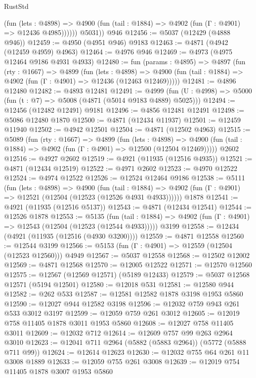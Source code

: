 \begin{lexlean}{RustStd}
\begin{coremodule}
              (fun (lets : @4898) =>
              @4900 (fun (tail : @1884) => @4902 (fun (Γ : @4901) => @12436 @4985))))))
        @5031))
    @946
@12456 := @5037 (@12429 (@4888 @946))
@12459 := @4950 (@4951 @946) @9183
@12463 := @4871 (@4942 (@12459 @4959) @4963)
@12464 := @4976 @946
@12469 := @4973 (@4975 @12464 @9186 @4931 @4933)
@12480 := fun (params : @4895) =>
  @4897
    (fun (rty : @1667) =>
    @4899
      (fun (lets : @4898) =>
      @4900 (fun (tail : @1884) => @4902 (fun (Γ : @4901) => @12436 (@12463 @12469)))))
@12481 := @4896 @12480
@12482 := @4893 @12481
@12491 := @4999 (fun (U : @4998) => @5000 (fun (t : @7) => @5008 (@4871 (@5014 @9183 @4889) @5025)))
@12494 := @12456 (@12482 @12491) @9181
@12496 := @4856 @12481 @12491
@12498 := @5086 @12480 @1870
@12500 := @4871 (@12434 @11937)
@12501 := @12459 @11940
@12502 := @4942 @12501
@12504 := @4871 (@12502 @4963)
@12515 := @5089
    (fun (rty : @1667) =>
    @4899
      (fun (lets : @4898) =>
      @4900 (fun (tail : @1884) => @4902 (fun (Γ : @4901) => @12500 (@12504 @12469)))))
    @2602
@12516 := @4927 @2602
@12519 := @4921 (@11935 (@12516 @4935))
@12521 := @4871 (@12434 @12519)
@12522 := @4971 @2602
@12523 := @4970 @12522
@12524 := @4974 @12522
@12526 := @12524 @12464 @9186
@12538 := @5111
    (fun (lets : @4898) =>
    @4900
      (fun (tail : @1884) =>
      @4902 (fun (Γ : @4901) => @12521 (@12504 (@12523 (@12526 @4931 @4933))))))
    @1878
@12541 := @4921 (@11935 (@12516 @5137))
@12543 := @4871 (@12434 @12541)
@12544 := @12526 @1878
@12553 := @5135
    (fun (tail : @1884) => @4902 (fun (Γ : @4901) => @12543 (@12504 (@12523 (@12544 @4933)))))
    @3199
@12558 := @12434 (@4921 (@11935 (@12516 (@4930 @3200))))
@12559 := @4871 @12558
@12560 := @12544 @3199
@12566 := @5153 (fun (Γ : @4901) => @12559 (@12504 (@12523 @12560))) @4949
@12567 := @5037 @12558
@12568 := @12502 @12002
@12569 := @4871 @12568
@12570 := @12005 @12522
@12571 := @12570 @12560
@12575 := @12567 (@12569 @12571) (@5189 @12433)
@12579 := @5037 @12568 @12571 (@5194 @12501)
@12580 := @12018 @531
@12581 := @12580 @944
@12582 := @262 @533
@12587 := @12581 @12582 @1878 @3198 @1953 @5860
@12590 := @12027 @944 @12582 @3198
@12596 := @12032 @759 @943 @261 @533 @3012 @3197
@12599 := @12059 @759 @261 @3012
@12605 := @12019 @758 @11405 @1878 @3011 @1953 @5860
@12608 := @12027 @758 @11405 @3011
@12609 := @12032 @712
@12614 := @12609 @757 @99 @263 @2964 @3010
@12623 := @12041 @711 @2964 (@5882 (@5883 @2964)) (@5772 (@5888 @711 @99))
@12624 := @12614 @12623
@12630 := @12032 @755 @64 @261 @11 @3008 @1889
@12633 := @12059 @755 @261 @3008
@12639 := @12019 @754 @11405 @1878 @3007 @1953 @5860

\end{coremodule}
\end{lexlean}
